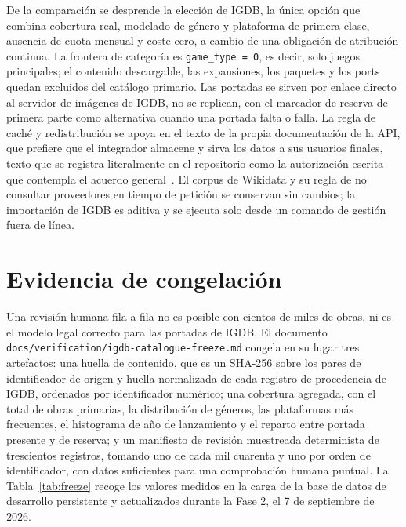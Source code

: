 De la comparación se desprende la elección de IGDB, la única opción que combina cobertura
real, modelado de género y plataforma de primera clase, ausencia de cuota mensual y coste
cero, a cambio de una obligación de atribución continua. La frontera de categoría es
\texttt{game\_type = 0}, es decir, solo juegos principales; el contenido descargable, las
expansiones, los paquetes y los ports quedan excluidos del catálogo primario. Las portadas se
sirven por enlace directo al servidor de imágenes de IGDB, no se replican, con el marcador de
reserva de primera parte como alternativa cuando una portada falta o falla. La
regla de caché y redistribución se apoya en el texto de la propia documentación de la API,
que prefiere que el integrador almacene y sirva los datos a sus usuarios finales, texto que
se registra literalmente en el repositorio como la autorización escrita que contempla el
acuerdo general~\cite{twitch-dsa}. El corpus de Wikidata y su regla de no consultar
proveedores en tiempo de petición se conservan sin cambios; la importación de IGDB es aditiva
y se ejecuta solo desde un comando de gestión fuera de línea.

\section{Evidencia de congelación}\label{sec:datos-congelacion}

Una revisión humana fila a fila no es posible con cientos de miles de obras, ni es el modelo
legal correcto para las portadas de IGDB. El documento
\texttt{docs/verification/igdb-catalogue-freeze.md} congela en su lugar tres artefactos: una
huella de contenido, que es un SHA-256 sobre los pares de identificador de origen y huella
normalizada de cada registro de procedencia de IGDB, ordenados por identificador numérico;
una cobertura agregada, con el total de obras primarias, la distribución de géneros, las
plataformas más frecuentes, el histograma de año de lanzamiento y el reparto entre portada
presente y de reserva; y un manifiesto de revisión muestreada determinista de trescientos
registros, tomando uno de cada mil cuarenta y uno por orden de identificador, con datos
suficientes para una comprobación humana puntual. La Tabla~\ref{tab:freeze} recoge los
valores medidos en la carga de la base de datos de desarrollo persistente y actualizados
durante la Fase 2, el 7 de septiembre de 2026.

